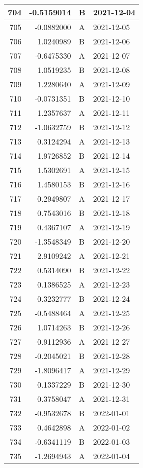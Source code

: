 \begin{tabular}{r|r|l|l}
\hline
704 & -0.5159014 & B & 2021-12-04\\
\hline
705 & -0.0882000 & A & 2021-12-05\\
\hline
706 & 1.0240989 & B & 2021-12-06\\
\hline
707 & -0.6475330 & A & 2021-12-07\\
\hline
708 & 1.0519235 & B & 2021-12-08\\
\hline
709 & 1.2280640 & A & 2021-12-09\\
\hline
710 & -0.0731351 & B & 2021-12-10\\
\hline
711 & 1.2357637 & A & 2021-12-11\\
\hline
712 & -1.0632759 & B & 2021-12-12\\
\hline
713 & 0.3124294 & A & 2021-12-13\\
\hline
714 & 1.9726852 & B & 2021-12-14\\
\hline
715 & 1.5302691 & A & 2021-12-15\\
\hline
716 & 1.4580153 & B & 2021-12-16\\
\hline
717 & 0.2949807 & A & 2021-12-17\\
\hline
718 & 0.7543016 & B & 2021-12-18\\
\hline
719 & 0.4367107 & A & 2021-12-19\\
\hline
720 & -1.3548349 & B & 2021-12-20\\
\hline
721 & 2.9109242 & A & 2021-12-21\\
\hline
722 & 0.5314090 & B & 2021-12-22\\
\hline
723 & 0.1386525 & A & 2021-12-23\\
\hline
724 & 0.3232777 & B & 2021-12-24\\
\hline
725 & -0.5488464 & A & 2021-12-25\\
\hline
726 & 1.0714263 & B & 2021-12-26\\
\hline
727 & -0.9112936 & A & 2021-12-27\\
\hline
728 & -0.2045021 & B & 2021-12-28\\
\hline
729 & -1.8096417 & A & 2021-12-29\\
\hline
730 & 0.1337229 & B & 2021-12-30\\
\hline
731 & 0.3758047 & A & 2021-12-31\\
\hline
732 & -0.9532678 & B & 2022-01-01\\
\hline
733 & 0.4642898 & A & 2022-01-02\\
\hline
734 & -0.6341119 & B & 2022-01-03\\
\hline
735 & -1.2694943 & A & 2022-01-04\\

\end{tabular}
